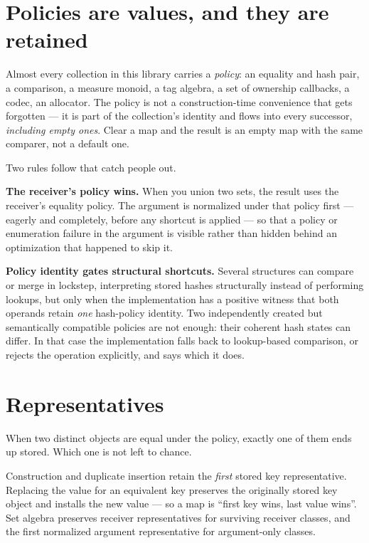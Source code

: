 \documentclass[11pt,twoside,openright]{book}
\newcommand{\term}[1]{\textit{#1}}
\begin{document}
\section{Policies are values, and they are retained}

Almost every collection in this library carries a \term{policy}: an equality and
hash pair, a comparison, a measure monoid, a tag algebra, a set of ownership
callbacks, a codec, an allocator. The policy is not a construction-time
convenience that gets forgotten --- it is part of the collection's identity and
flows into every successor, \emph{including empty ones}. Clear a map and the
result is an empty map with the same comparer, not a default one.

Two rules follow that catch people out.

\textbf{The receiver's policy wins.} When you union two sets, the result uses the
receiver's equality policy. The argument is normalized under that policy first
--- eagerly and completely, before any shortcut is applied --- so that a policy
or enumeration failure in the argument is visible rather than hidden behind an
optimization that happened to skip it.

\textbf{Policy identity gates structural shortcuts.} Several structures can
compare or merge in lockstep, interpreting stored hashes structurally instead of
performing lookups, but only when the implementation has a positive witness that
both operands retain \emph{one} hash-policy identity. Two independently created
but semantically compatible policies are not enough: their coherent hash states
can differ. In that case the implementation falls back to lookup-based
comparison, or rejects the operation explicitly, and says which it does.

\section{Representatives}

When two distinct objects are equal under the policy, exactly one of them ends
up stored. Which one is not left to chance.

\begin{contractbox}
Construction and duplicate insertion retain the \emph{first} stored key
representative. Replacing the value for an equivalent key preserves the
originally stored key object and installs the new value --- so a map is
``first key wins, last value wins''. Set algebra preserves receiver
representatives for surviving receiver classes, and the first normalized
argument representative for argument-only classes.
\end{contractbox}
\end{document}
